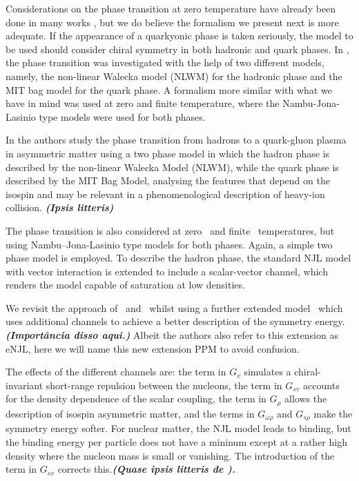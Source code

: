 \documentclass[prc, reprint, amsmath, floatfix,10pt]{revtex4-1}
\newcommand{\comment}[1]{{\bf\textit{#1}}}
\begin{document}
Considerations on the phase transition at zero temperature have already been done in many works \cite{Cavagnoli2011, Tsue2010, Lee2013}, but we do believe the formalism we present next is more adequate. If the appearance of a quarkyonic phase is taken seriously, the model to be used should consider chiral symmetry in both hadronic and quark phases. In \cite{Cavagnoli2011}, the phase transition was investigated with the help of two different models, namely, the non-linear Walecka model (NLWM) for the hadronic phase and the MIT bag model for the quark phase. A formalism more similar with what we have in mind was used at zero \cite{Tsue2010} and finite \cite{Lee2013} temperature, where the Nambu-Jona-Lasinio type models were used for both phases.

In \cite{Cavagnoli2011} the authors study the phase transition from hadrons to a quark-gluon plasma in asymmetric matter using a two phase model in which the hadron phase is described by the non-linear Walecka Model (NLWM), while the quark phase is described by the MIT Bag Model, analysing the features that depend on the isospin and may be relevant in a phenomenological description of heavy-ion collision. \comment{(Ipsis litteris)}

The phase transition is also considered at zero~\cite{Tsue2010} and finite~\cite{Lee2013} temperatures, but using Nambu--Jona-Lasinio type models for both phases. Again, a simple two phase model is employed. To describe the hadron phase, the standard NJL model with vector interaction is extended to include a scalar-vector channel, which renders the model capable of saturation at low densities.

We revisit the approach of~\cite{Tsue2010} and~\cite{Lee2013} whilst using a further extended model~\cite{Pais2016} which uses additional channels to achieve a better description of the symmetry energy. \comment{(Importância disso aqui.)} Albeit the authors also refer to this extension as eNJL, here we will name this new extension PPM to avoid confusion.

The effects of the different channels are: the term in $G_v$ simulates a chiral-invariant short-range repulsion between the nucleons, the term in $G_{sv}$ accounts for the density dependence of the scalar coupling, the term in $G_\rho$ allows the description of isospin asymmetric matter, and the terms in $G_{\omega\rho}$ and $G_{s\rho}$ make the symmetry energy softer. For nuclear matter, the NJL model leads to binding, but the binding energy per particle does not have a mininum except at a rather high density where the nucleon mass is small or vanishing. The introduction of the term in $G_{sv}$ corrects this.\comment{(Quase ipsis litteris de \cite{Pais2016}).}
\end{document}

